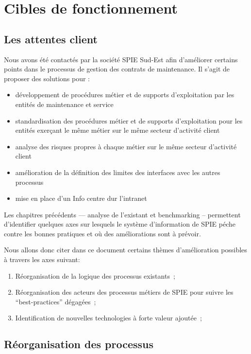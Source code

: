\chapter{Cibles de fonctionnement}

\section{Les attentes client}

Nous avons été contactés par la société SPIE Sud-Est afin d'améliorer certains points dans le processus de gestion des contrats de maintenance. Il s'agit de proposer des solutions pour :

\begin{itemize}
    \item développement de procédures métier et de supports d'exploitation par les entités de maintenance et service
    \item standardisation des procédures métier et de supports d'exploitation pour les entités exerçant le même métier sur le même secteur d'activité client
    \item analyse des risques propres à chaque métier sur le même secteur d'activité client
    \item amélioration de la définition des limites des interfaces avec les autres processus
    \item mise en place d'un Info centre dur l'intranet
\end{itemize}

Les chapitres précédents --- analyse de l'existant et benchmarking -- permettent d'identifier quelques axes sur lesquels le système d'information de SPIE péche contre les bonnes pratiques et où des améliorations sont à prévoir.

    Nous allons donc citer dans ce document certains thèmes d'amélioration possibles à travers les axes suivant:

    \begin{enumerate}
        \item Réorganisation de la logique des processus existants~;
        \item Réorganisation des acteurs des processus métiers de SPIE pour suivre les ``best-practices'' dégagées~;
        \item Identification de nouvelles technologies à forte valeur ajoutée~;
    \end{enumerate}

\section{Réorganisation des processus}

